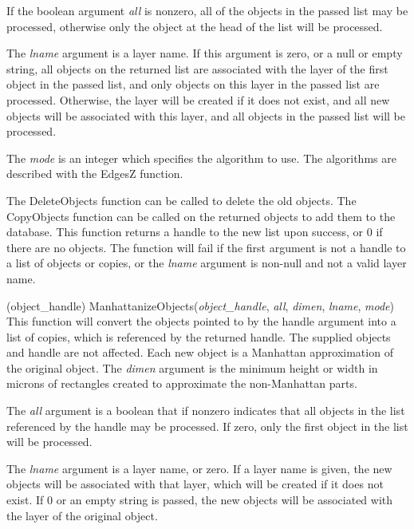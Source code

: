 \begin{description}
If the boolean argument {\it all} is nonzero, all of the objects in
the passed list may be processed, otherwise only the object at the
head of the list will be processed.

The {\it lname} argument is a layer name.  If this argument is zero,
or a null or empty string, all objects on the returned list are
associated with the layer of the first object in the passed list, and
only objects on this layer in the passed list are processed. 
Otherwise, the layer will be created if it does not exist, and all new
objects will be associated with this layer, and all objects in the
passed list will be processed.

The {\it mode} is an integer which specifies the algorithm to use.  The
algorithms are described with the {\vt EdgesZ} function.

The {\vt DeleteObjects} function can be called to delete the old
objects.  The {\vt CopyObjects} function can be called on the returned
objects to add them to the database.  This function returns a handle
to the new list upon success, or 0 if there are no objects.  The
function will fail if the first argument is not a handle to a list of
objects or copies, or the {\it lname} argument is non-null and not a
valid layer name.

\item{(object\_handle) \vt ManhattanizeObjects({\it object\_handle},
 {\it all\/}, {\it dimen\/}, {\it lname\/}, {\it mode\/})}\\
This function will convert the objects pointed to by the handle
argument into a list of copies, which is referenced by the returned
handle.  The supplied objects and handle are not affected.  Each new
object is a Manhattan approximation of the original object.  The {\it
dimen} argument is the minimum height or width in microns of
rectangles created to approximate the non-Manhattan parts.

The {\it all} argument is a boolean that if nonzero indicates that all
objects in the list referenced by the handle may be processed.  If
zero, only the first object in the list will be processed.

The {\it lname} argument is a layer name, or zero.  If a layer name is
given, the new objects will be associated with that layer, which will
be created if it does not exist.  If 0 or an empty string is passed,
the new objects will be associated with the layer of the original
object.


\end{description}
